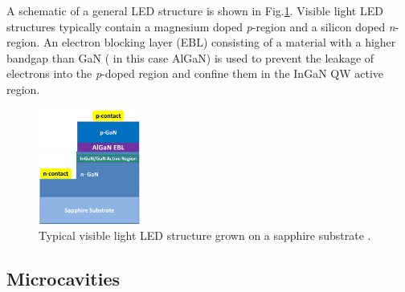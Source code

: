 \FloatBarrier

A schematic of a general LED structure is shown in Fig.\ref{1.11}. Visible light LED structures typically contain a magnesium doped {\it p}-region and a silicon doped {\it n}-region. An electron blocking layer  (EBL) consisting of a material with a higher bandgap than GaN ( in this case AlGaN) is used to prevent the leakage of electrons into the {\it p}-doped region and confine them in the InGaN QW active region.

\begin{figure}[h]
	\centering
	\includegraphics[width=0.3\textwidth]{Figs/Ch1/led.png}
	\caption {Typical visible light LED structure grown on a sapphire substrate \cite{Ren2015}.}
	\label{1.11}
\end{figure}
\FloatBarrier 

\subsection{Microcavities}

